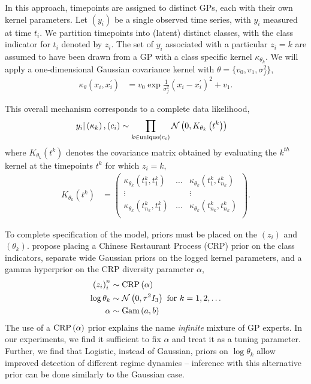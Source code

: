 \documentclass{article}
\begin{document}
In this approach, timepoints are assigned to distinct GPs, each with their own
kernel parameters. Let $\left(y_{i}\right)$ be a single observed time series,
with $y_{i}$ measured at time $t_{i}$. We partition timepoints into (latent)
distinct classes, with the class indicator for $t_i$ denoted by $z_i$. The set
of $y_i$ associated with a particular $z_i = k$ are assumed to have been drawn
from a GP with a class specific kernel $\kappa_{\theta_k}$. We will apply a
one-dimensional Gaussian covariance kernel with $\theta = \{v_0, v_1, \sigma_f^2\}$,
\begin{align*}
  \kappa_\theta\left(x_i, x_i^\prime\right) &= v_0 \exp{\frac{1}{\sigma_f^2} \left(x_i - x_i^\prime\right)^2} + v_1.
\end{align*}

This overall mechanism corresponds to a complete data likelihood,
\begin{align*}
 y_i \vert \left(\kappa_k\right), \left(c_i\right) &\sim \prod_{k \in \text{unique}\left(c_i\right)} \mathcal{N}\left(0, K_{\theta_k}\left(t^k\right)\right)
\end{align*}
where $K_{\theta_k}\left(t^k\right)$ denotes the covariance matrix obtained by
evaluating the $k^{th}$ kernel at the timepoints $t^k$ for which $z_i = k$,
\begin{align*}
  K_{\theta_k}\left(t^k\right) &= \begin{pmatrix}
    \kappa_{\theta_k}\left(t^k_1, t^k_1\right) & \dots  & \kappa_{\theta_k}\left(t^k_1, t^k_{n_k}\right) \\
    \vdots & & \vdots \\
    \kappa_{\theta_k}\left(t^k_{n_k}, t^k_1\right) & \dots  & \kappa_{\theta_k}\left(t^k_{n_k}, t^k_{n_k}\right) \\
  \end{pmatrix}.
\end{align*}

To complete specification of the model, priors must be placed on the
$\left(z_i\right)$ and $\left(\theta_k\right)$. \citep{rasmussen2002infinite}
propose placing a Chinese Restaurant Process (CRP) prior on the class indicators,
separate wide Gaussian priors on the logged kernel parameters, and a gamma
hyperprior on the CRP diversity parameter $\alpha$,
\begin{align*}
  \left(z_i\right)_i^n &\sim \textnormal{CRP}\left(\alpha\right) \\
  \log \theta_k &\sim \mathcal{N}\left(0, \tau^2 I_3\right) \text{ for } k = 1, 2, \dots \\
  \alpha &\sim \textnormal{Gam}\left(a, b\right)
\end{align*}
The use of a $\textnormal{CRP}\left(\alpha\right)$ prior explains the name \textit{infinite}
mixture of GP experts. In our experiments, we find it sufficient to fix $\alpha$
and treat it as a tuning parameter. Further, we find that Logistic, instead of
Gaussian, priors on $\log \theta_k$ allow improved detection of different regime
dynamics -- inference with this alternative prior can be done similarly to the
Gaussian case.
\end{document}
